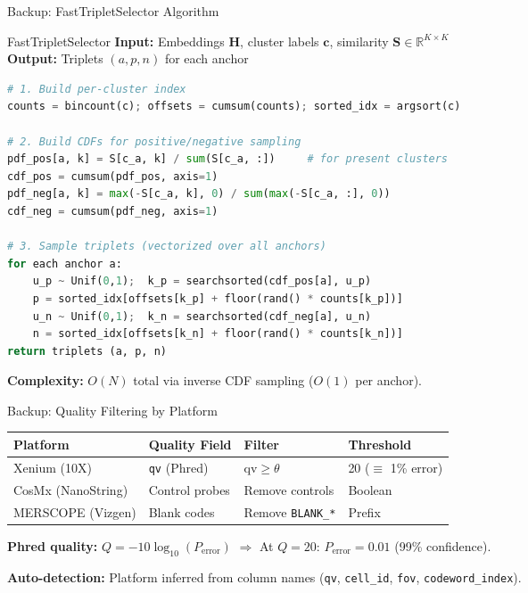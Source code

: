 \documentclass[aspectratio=169,10pt]{beamer}
\newcommand{\vect}[1]{\boldsymbol{#1}}
\newcommand{\mat}[1]{\mathbf{#1}}
\newcommand{\Real}{\mathbb{R}}
\begin{document}
\begin{frame}[fragile]{Backup: FastTripletSelector Algorithm}

\begin{block}{FastTripletSelector}
{\footnotesize
\textbf{Input:} Embeddings $\mat{H}$, cluster labels $\vect{c}$, similarity $\mat{S} \in \Real^{K \times K}$ \\
\textbf{Output:} Triplets $(a, p, n)$ for each anchor
}
\end{block}

\vspace{-0.1cm}
\begin{lstlisting}[language=Python, basicstyle=\ttfamily\tiny]
# 1. Build per-cluster index
counts = bincount(c); offsets = cumsum(counts); sorted_idx = argsort(c)

# 2. Build CDFs for positive/negative sampling
pdf_pos[a, k] = S[c_a, k] / sum(S[c_a, :])     # for present clusters
cdf_pos = cumsum(pdf_pos, axis=1)
pdf_neg[a, k] = max(-S[c_a, k], 0) / sum(max(-S[c_a, :], 0))
cdf_neg = cumsum(pdf_neg, axis=1)

# 3. Sample triplets (vectorized over all anchors)
for each anchor a:
    u_p ~ Unif(0,1);  k_p = searchsorted(cdf_pos[a], u_p)
    p = sorted_idx[offsets[k_p] + floor(rand() * counts[k_p])]
    u_n ~ Unif(0,1);  k_n = searchsorted(cdf_neg[a], u_n)
    n = sorted_idx[offsets[k_n] + floor(rand() * counts[k_n])]
return triplets (a, p, n)
\end{lstlisting}

{\footnotesize\textbf{Complexity:} $O(N)$ total via inverse CDF sampling ($O(1)$ per anchor).}
\end{frame}

\begin{frame}{Backup: Quality Filtering by Platform}

\begin{center}
\renewcommand{\arraystretch}{1.2}
{\small
\begin{tabular}{@{}l l l l@{}}
\toprule
\textbf{Platform} & \textbf{Quality Field} & \textbf{Filter} & \textbf{Threshold} \\
\midrule
Xenium (10X) & \texttt{qv} (Phred) & $\text{qv} \geq \theta$ & 20 ($\equiv$ 1\% error) \\
CosMx (NanoString) & Control probes & Remove controls & Boolean \\
MERSCOPE (Vizgen) & Blank codes & Remove \texttt{BLANK\_*} & Prefix \\
\bottomrule
\end{tabular}
}
\end{center}

\vspace{0.3cm}

\textbf{Phred quality:}
$Q = -10 \log_{10}(P_{\text{error}})$
\quad $\Rightarrow$ \quad
At $Q=20$: $P_{\text{error}} = 0.01$ (99\% confidence).

\vspace{0.3cm}

\textbf{Auto-detection:} Platform inferred from column names (\texttt{qv}, \texttt{cell\_id}, \texttt{fov}, \texttt{codeword\_index}).
\end{frame}
\end{document}
